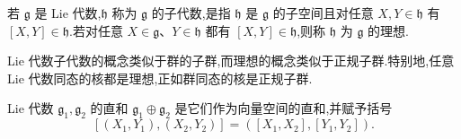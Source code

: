{\begin{definition}[子代数与理想]\label{def:lie-subalgebra-ideal}
若 $\mathfrak g$ 是 Lie 代数,$\mathfrak h$ 称为 $\mathfrak g$ 的子代数,是指 $\mathfrak h$ 是 $\mathfrak g$ 的子空间且对任意 $X,Y\in\mathfrak h$ 有 $[X,Y]\in\mathfrak h$.若对任意 $X\in\mathfrak g$、$Y\in\mathfrak h$ 都有 $[X,Y]\in\mathfrak h$,则称 $\mathfrak h$ 为 $\mathfrak g$ 的理想.
\end{definition}

Lie 代数子代数的概念类似于群的子群,而理想的概念类似于正规子群.特别地,任意 Lie 代数同态的核都是理想,正如群同态的核是正规子群.

\begin{definition}\label{def:lie-algebra-direct-sum}
Lie 代数 $\mathfrak g_1,\mathfrak g_2$ 的直和 $\mathfrak g_1\oplus\mathfrak g_2$ 是它们作为向量空间的直和,并赋予括号
\[
[(X_1,Y_1),(X_2,Y_2)]=([X_1,X_2],[Y_1,Y_2]).
\]
\end{definition}

}

\def\ChapterSixteenMatrixExponential{
\section{矩阵指数}
\label{sec:matrix-exponential}

下一节将把每个矩阵 Lie 群与一个 Lie 代数关联起来.为说明这一关联,需要矩阵指数的概念.对 $X\in M_n(\mathbb C)$,定义
\[
e^X=\exp(X):=\sum_{m=0}^{\infty}\frac{X^m}{m!},
\qquad X^0=I.
\label{eq:matrix-exponential}
\]
这个级数对所有 $X$ 绝对收敛,因为若 $\|X\|$ 是算子范数,则 $\|X^m\|\leq\|X\|^m$.在有限维情形,也可以使用 Hilbert--Schmidt 范数.

\begin{theorem}[矩阵指数的性质]\label{thm:matrix-exponential-properties}
对任意 $X,Y\in M_n(\mathbb C)$,矩阵指数满足:
\begin{enumerate}
\item $e^0=I$;
\item $(e^X)^{\mathsf{tr}}=e^{X^{\mathsf{tr}}}$ 且 $(e^X)^*=e^{X^*}$;
\item 若 $A$ 可逆,则 $e^{AXA^{-1}}=Ae^XA^{-1}$;
\item $\det(e^X)=e^{\operatorname{tr}(X)}$;
\item 若 $XY=YX$,则 $e^{X+Y}=e^Xe^Y$;
\item $e^X$ 可逆且 $(e^X)^{-1}=e^{-X}$;
\item 即使 $XY\neq YX$,仍有 Lie 乘积公式
\[
e^{X+Y}=\lim_{m\to\infty}\left(e^{X/m}e^{Y/m}\right)^m.
\]
\end{enumerate}
\end{theorem}

}

